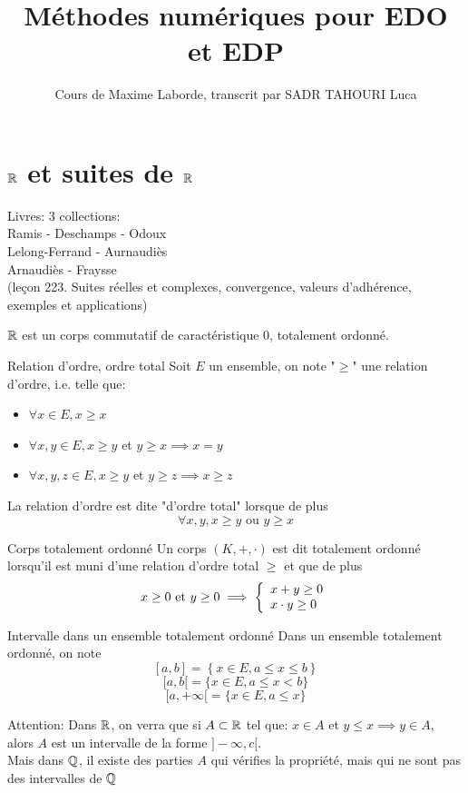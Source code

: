 \documentclass[]{report}
\title{Méthodes numériques pour EDO et EDP}
\author{Cours de Maxime Laborde, transcrit par SADR TAHOURI Luca}
\date{}
\begin{document}
\chapter{$\mathbb{R}$ et suites de $\mathbb{R}$}

Livres: 3 collections:\\
Ramis - Deschamps - Odoux\\
Lelong-Ferrand - Aurnaudiès\\
Arnaudiès - Fraysse\\

(leçon 223. Suites réelles et complexes, convergence, valeurs d'adhérence, exemples et applications)

$\mathbb{R}$ est un corps commutatif de caractéristique $0$, totalement ordonné.

\begin{df}{Relation d'ordre, ordre total}{}
    Soit $E$ un ensemble, on note "$\ge$" une relation d'ordre, i.e. telle que:
    \begin{itemize}
        \item $\forall x\in E, x\ge x$
        \item $\forall x,y\in E,x\ge y$ et $y\ge x \implies x=y$
        \item $\forall x,y,z\in E,x\ge y$ et $y\ge z\implies x\ge z$
    \end{itemize}
    La relation d'ordre est dite "d'ordre total" lorsque de plus
    \[\forall x,y, x\ge y\text{ ou }y\ge x\]
\end{df}

\begin{df}{Corps totalement ordonné}{}
    Un corps $(K,+,\cdot)$ est dit totalement ordonné lorsqu'il est muni d'une relation d'ordre total $\ge$ et que de plus
    \[x\ge 0\text{ et }y\ge 0\implies \left\{\begin{array}{ll} x+y\ge 0\\ x\cdot y \ge 0 \end{array} \right.\]
\end{df}

\begin{df}{Intervalle dans un ensemble totalement ordonné}{}
    Dans un ensemble totalement ordonné, on note
    \[ \left[a,b\right]=\left\{ x\in E, a\le x\le b\right\}\]
    \[ [a,b[=\{x\in E, a\le x <b\}\]
    \[ [a,+\infty[=\{x\in E, a\le x\}\]
\end{df}

Attention: Dans $\mathbb{R}$, on verra que si $A\subset \mathbb{R}$ tel que: $x\in A$ et $y\le x\implies y\in A$, alors $A$ est un intervalle de la forme $]-\infty,c[$.\\
Mais dans $\mathbb{Q}$, il existe des parties $A$ qui vérifies la propriété, mais qui ne sont pas des intervalles de $\mathbb{Q}$
\end{document}
